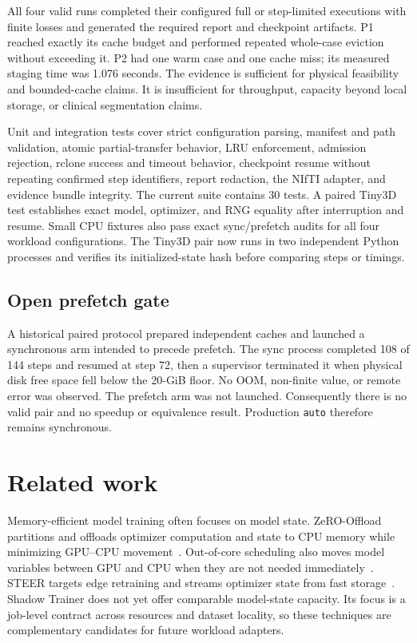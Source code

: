 \documentclass[10pt,twocolumn]{article}
\begin{document}
All four valid runs completed their configured full or step-limited executions with finite losses and generated
the required report and checkpoint artifacts. P1 reached exactly its cache
budget and performed repeated whole-case eviction without exceeding it. P2 had
one warm case and one cache miss; its measured staging time was 1.076 seconds.
The evidence is sufficient for physical feasibility and bounded-cache claims.
It is insufficient for throughput, capacity beyond local storage, or clinical
segmentation claims.

Unit and integration tests cover strict configuration parsing, manifest and
path validation, atomic partial-transfer behavior, LRU enforcement, admission
rejection, rclone success and timeout behavior, checkpoint resume without
repeating confirmed step identifiers, report redaction, the NIfTI adapter, and
evidence bundle integrity. The current suite contains 30 tests. A paired Tiny3D test establishes exact model, optimizer, and RNG equality after interruption and resume. Small CPU fixtures also pass exact sync/prefetch audits for all four workload configurations. The Tiny3D pair now runs in two independent Python processes and verifies its initialized-state hash before comparing steps or timings.

\subsection{Open prefetch gate}

A historical paired protocol prepared independent caches and launched a
synchronous arm intended to precede prefetch. The sync process completed 108 of
144 steps and resumed at step 72, then a supervisor terminated it when physical
disk free space fell below the 20-GiB floor. No OOM, non-finite value, or remote
error was observed. The prefetch arm was not launched. Consequently there is
no valid pair and no speedup or equivalence result. Production \texttt{auto}
therefore remains synchronous.




\section{Related work}

Memory-efficient model training often focuses on model state. ZeRO-Offload
partitions and offloads optimizer computation and state to CPU memory while
minimizing GPU--CPU movement~\cite{zerooffload}. Out-of-core scheduling also
moves model variables between GPU and CPU when they are not needed
immediately~\cite{outofcore}. STEER targets edge retraining and streams
optimizer state from fast storage~\cite{steer}. Shadow Trainer does not yet
offer comparable model-state capacity. Its focus is a job-level contract across
resources and dataset locality, so these techniques are complementary candidates
for future workload adapters.
\end{document}
